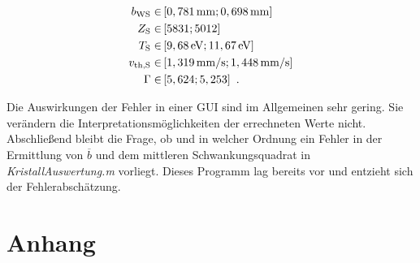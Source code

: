 \documentclass[numbers=noenddot,a4paper,notitlepage,twoside,BCOR15mm]{scrartcl}
\newcommand{\ix}[1]{_\text{#1}}
\newcommand{\tilt}[1]{\textit{#1}}
\begin{document}
			\begin{align}
				b\ix{WS}\in&\left[\unit[0,781]{mm}; \unit[0,698]{mm}\right] \nonumber \\
				Z\ix{S}\in&\left[5831; 5012\right] \nonumber \\
				T\ix{S}\in&\left[\unit[9,68]{eV}; \unit[11,67]{eV}\right] \nonumber \\
				v\ix{th,S}\in&\left[\unit[1,319]{mm/s}; \unit[1,448]{mm/s}\right] \nonumber \\
				\Gamma\in&\left[5,624; 5,253\right] \nonumber \,\,.
			\end{align}

		Die Auswirkungen der Fehler in einer GUI sind im Allgemeinen sehr gering. Sie verändern die Interpretationsmöglichkeiten der errechneten Werte nicht.\\
		Abschließend bleibt die Frage, ob und in welcher Ordnung ein Fehler in der Ermittlung von $\overline{b}$ und dem mittleren Schwankungsquadrat in \tilt{KristallAuswertung.m} vorliegt. Dieses Programm lag bereits vor und entzieht sich der Fehlerabschätzung.

	\newpage
	\section{Anhang}

		
		
\end{document}
